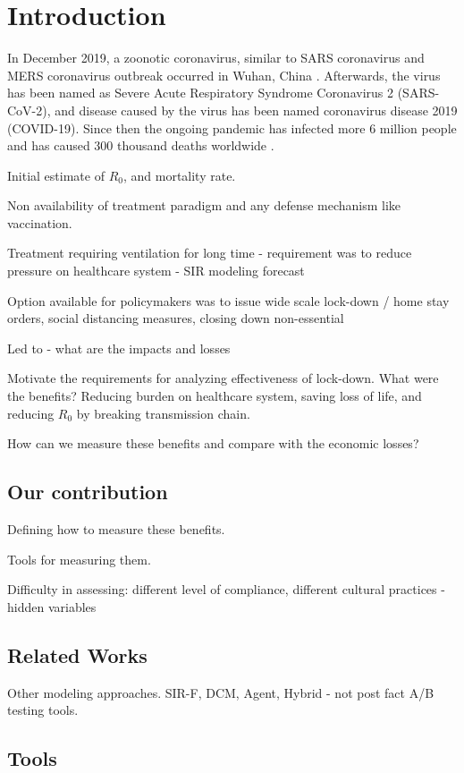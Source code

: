 \documentclass[preprint,authoryear,12pt]{elsarticle}
\begin{document}
	
	\section{Introduction}
	\label{SEC1}
	In December 2019, a zoonotic coronavirus, similar to SARS coronavirus and MERS coronavirus outbreak occurred in Wuhan, China \cite{taaa021}.  Afterwards, the virus has been named as Severe Acute Respiratory Syndrome Coronavirus 2 (SARS-CoV-2), and disease caused by the virus has been named coronavirus disease 2019 (COVID-19). Since then the ongoing pandemic has infected more 6 million people and has caused 300 thousand deaths worldwide .
	
	Initial estimate of $R_0$, and mortality rate. 
	
	Non availability of treatment paradigm and any defense mechanism like vaccination.
	 
	Treatment requiring ventilation for long time - requirement was to reduce pressure on healthcare system - SIR modeling forecast 
	
	Option available for policymakers was to issue wide scale lock-down / home stay orders, social distancing measures, closing down non-essential 
	
	Led to - what are the impacts and losses
	
	Motivate the requirements for analyzing effectiveness of lock-down.   What were the benefits? Reducing burden on healthcare system, saving loss of life, and reducing $R_0$ by breaking transmission chain. 
	
	How can we measure these benefits and compare with the economic losses?
	
	\subsection{Our contribution}
	Defining how to measure these benefits.
	
	Tools for measuring them.
	
	
	Difficulty in assessing: different level of compliance, different cultural practices - hidden variables
	
	\subsection{Related Works}
	Other modeling approaches. SIR-F, DCM, Agent, Hybrid - not post fact A/B testing tools.
	
	\subsection{Tools}
	
\end{document}
